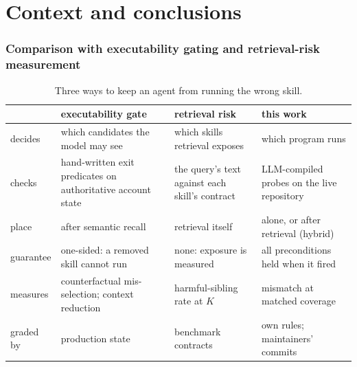 \documentclass[11pt]{article}
\begin{document}
\clearpage
\part{Context and conclusions}

\section{Comparison with executability gating and retrieval-risk measurement}
\label{sec:comparison}

\begin{table}[t]
\centering
\caption{Three ways to keep an agent from running the wrong skill.}
\label{tab:comparison}
\small
\begin{tabularx}{\linewidth}{lXXX}
\toprule
& executability gate \cite{wix2026gating} & retrieval risk \cite{ding2026rightfamily} & this work \\
\midrule
decides & which candidates the model may see & which skills retrieval exposes & which program runs \\
checks & hand-written exit predicates on authoritative account state & the query's text against each skill's contract & LLM-compiled probes on the live repository \\
place & after semantic recall & retrieval itself & alone, or after retrieval (hybrid) \\
guarantee & one-sided: a removed skill cannot run & none: exposure is measured & all preconditions held when it fired \\
measures & counterfactual mis-selection; context reduction & harmful-sibling rate at $K$ & mismatch at matched coverage \\
graded by & production state & benchmark contracts & own rules; maintainers' commits \\
\bottomrule
\end{tabularx}
\end{table}

\begin{table}[t]
\centering
\caption{Checks evaluated per request on the eval block, by how programs are tried, with the
decisions each makes and the share of checks saved against trying every program. A lazy walk
stops at the first program whose preconditions all hold.}
\label{tab:probecost}
\small
\setlength{\tabcolsep}{3pt}
\resizebox{\linewidth}{!}{}
\end{table}
\end{document}
